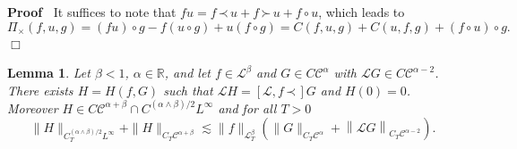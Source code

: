 \documentclass[a4paper,11pt]{article}
\newenvironment{proof}{\noindent\textbf{Proof\ }}{\hspace*{\fill}$\Box$\medskip}
\newtheorem{lemma}{Lemma}
{\theorembodyfont{\rmfamily}\newtheorem{remark}{Remark}}
\newcommand{\LL}{\mathscr{L}}
\newcommand{\CC}{\mathscr{C}}
\newcommand{\lpara}{\,\mathord{\prec}\,}
\newcommand{\rpara}{\,\mathord{\succ}\,}
\newcommand{\reso}{\,\mathord{\circ}\,}
\begin{document}
\begin{proof}
  It suffices to note that $fu = f \lpara u + f \rpara u + f \reso u$, which
  leads to
  \[ \Pi_{\times} (f, u, g) = (fu) \reso g - f (u \reso g) + u (f \reso g) = C
     (f, u, g) + C (u, f, g) + (f \reso u) \reso g. \]
\end{proof}

\begin{lemma}
  \label{lemma:comm-L-para}Let $\beta < 1$, $\alpha \in \mathbb{R}$, and let
  $f \in \LL^{\beta}$ and $G \in C \CC^{\alpha}$ with $\LL G \in C \CC^{\alpha
  - 2}$. There exists $H = H (f, G)$ such that $\LL H = \left[ \LL, f \lpara
  \right] G$ and $H (0) = 0$. Moreover $H \in C \CC^{\alpha + \beta} \cap
  C^{(\alpha \wedge \beta) / 2} L^{\infty}$ and for all $T > 0$
  \[ \| H \|_{C^{(\alpha \wedge \beta) / 2}_T L^{\infty}} + \| H \|_{C_T
     \CC^{\alpha + \beta}} \lesssim \| f \|_{\LL^{\beta}_T} \left( \| G
     \|_{C_T \CC^{\alpha}} + \left\| \LL G \right\|_{C_T \CC^{\alpha - 2}}
     \right) . \]
\end{lemma}
\end{document}
